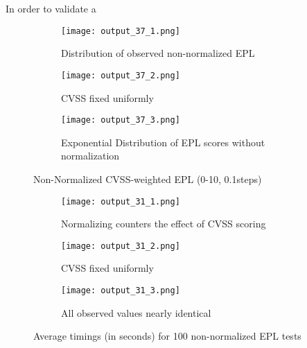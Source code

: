 
In order to validate a 


\graphicspath{{img/results/}}

\begin{figure*}
    \centering
    \begin{subfigure}[t]{0.3\textwidth}
        \texttt{[image: output\_37\_1.png]} 
        \caption{Distribution of observed non-normalized EPL} 
        \label{fig:refnet_small}
    \end{subfigure}
          \begin{subfigure}[t]{0.3\textwidth}
        \centering
        \texttt{[image: output\_37\_2.png]}
        \caption{CVSS fixed uniformly}
        \label{fig:refnet_med}
    \end{subfigure}
     \begin{subfigure}[t]{0.3\textwidth}
        \centering
        \texttt{[image: output\_37\_3.png]}
        \caption{Exponential Distribution of EPL scores without normalization}
        \label{fig:refnet_large}
    \end{subfigure}
    \hfill
    \caption{Non-Normalized CVSS-weighted EPL (0-10, 0.1steps)}
    \label{fig:unweighted_epl}
\end{figure*}

\begin{figure*}
    \centering
    \begin{subfigure}[t]{0.3\textwidth}
        \texttt{[image: output\_31\_1.png]} 
        \caption{Normalizing counters the effect of CVSS scoring} 
        \label{fig:norm_epl}
    \end{subfigure}
          \begin{subfigure}[t]{0.3\textwidth}
        \centering
        \texttt{[image: output\_31\_2.png]}
        \caption{CVSS fixed uniformly}
        \label{fig:refnet_med}
    \end{subfigure}
     \begin{subfigure}[t]{0.3\textwidth}
        \centering
        \texttt{[image: output\_31\_3.png]}
        \caption{All observed values nearly identical}
        \label{fig:refnet_large}
    \end{subfigure}
    \hfill
    \caption{Average timings (in seconds) for 100 non-normalized EPL tests }
    \label{fig:weighted_epl}
\end{figure*}

